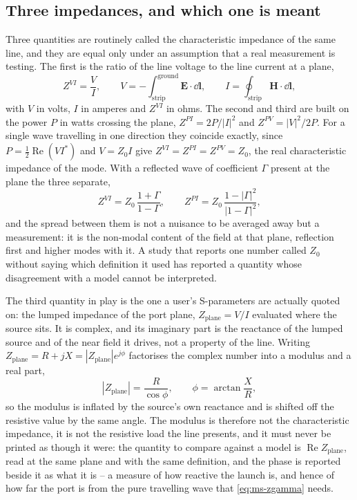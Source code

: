 \subsection{Three impedances, and which one is meant}
\label{sec:ms-z0}

Three quantities are routinely called the characteristic impedance of the same line, and they are equal only
under an assumption that a real measurement is testing. The first is the ratio of the line voltage to the line
current at a plane,
\begin{equation}
  Z^{VI} = \frac{V}{I}, \qquad
  V = -\int_{\text{strip}}^{\text{ground}} \mathbf{E}\cdot \dd\mathbf{l}, \qquad
  I = \oint_{\text{strip}} \mathbf{H}\cdot \dd\mathbf{l},
  \label{eq:ms-zdefs}
\end{equation}
with $V$ in volts, $I$ in amperes and $Z^{VI}$ in ohms. The second and third are built on the power $P$ in
watts crossing the plane, $Z^{PI} = 2P/|I|^2$ and $Z^{PV} = |V|^2/2P$. For a single wave travelling in one
direction they coincide exactly, since $P = \tfrac12\operatorname{Re}(VI^{*})$ and $V = Z_0 I$ give
$Z^{VI} = Z^{PI} = Z^{PV} = Z_0$, the real characteristic impedance of the mode. With a reflected wave of
coefficient $\Gamma$ present at the plane the three separate,
\begin{equation}
  Z^{VI} = Z_0\,\frac{1+\Gamma}{1-\Gamma}, \qquad
  Z^{PI} = Z_0\,\frac{1-|\Gamma|^2}{|1-\Gamma|^2},
  \label{eq:ms-zgamma}
\end{equation}
and the spread between them is not a nuisance to be averaged away but a measurement: it is the non-modal
content of the field at that plane, reflection first and higher modes with it. A study that reports one number
called $Z_0$ without saying which definition it used has reported a quantity whose disagreement with a model
cannot be interpreted.

The third quantity in play is the one a user's S-parameters are actually quoted on: the lumped impedance of
the port plane, $Z_{\mathrm{plane}} = V/I$ evaluated where the source sits. It is complex, and its imaginary
part is the reactance of the lumped source and of the near field it drives, not a property of the line. Writing
$Z_{\mathrm{plane}} = R + jX = |Z_{\mathrm{plane}}|e^{j\phi}$ factorises the complex number into a modulus and a
real part,
\begin{equation}
  |Z_{\mathrm{plane}}| = \frac{R}{\cos\phi}, \qquad \phi = \arctan\frac{X}{R},
  \label{eq:ms-zplane}
\end{equation}
so the modulus is inflated by the source's own reactance and is shifted off the resistive value by the same
angle. The modulus is therefore not the characteristic impedance, it is not the resistive load the line
presents, and it must never be printed as though it were: the quantity to compare against a model is
$\operatorname{Re} Z_{\mathrm{plane}}$, read at the same plane and with the same definition, and the phase is
reported beside it as what it is -- a measure of how reactive the launch is, and hence of how far the port is
from the pure travelling wave that \eqref{eq:ms-zgamma} needs.

